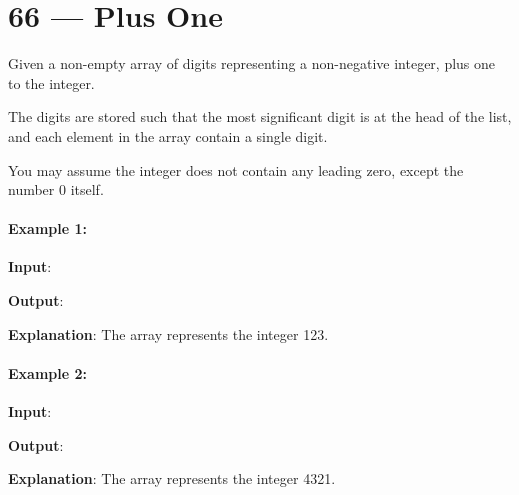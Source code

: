 \section{66 --- Plus One}
Given a non-empty array of digits representing a non-negative integer, plus one to the integer.

The digits are stored such that the most significant digit is at the head of the list, and each element in the array contain a single digit.

You may assume the integer does not contain any leading zero, except the number 0 itself.

\paragraph{Example 1:}

\begin{flushleft}
\textbf{Input}: \fcj{[1,2,3]}

\textbf{Output}: \fcj{[1,2,4]}

\textbf{Explanation}: The array represents the integer 123.
\end{flushleft}

\paragraph{Example 2:}

\begin{flushleft}
\textbf{Input}: \fcj{[4,3,2,1]}

\textbf{Output}: \fcj{[4,3,2,2]}

\textbf{Explanation}: The array represents the integer 4321.
\end{flushleft}